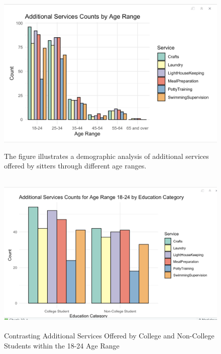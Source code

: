 \documentclass[12pt]{article}
\begin{document}
\begin{figure}
\centering
\includegraphics[width=6.25in,height=3.125in]{IMAGES/additionalservicesbri2.png}
\caption{The figure illustrates a demographic analysis of additional
services offered by sitters through different age ranges.}
\end{figure}

\newpage
\newpage

\begin{figure}
\centering
\includegraphics[width=6.25in,height=3.125in]{IMAGES/AdditionalServices Bri.png}
\caption{Contrasting Additional Services Offered by College and
Non-College Students within the 18-24 Age Range}
\end{figure}
\end{document}
